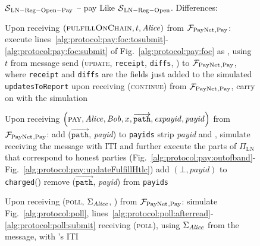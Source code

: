 \begin{figure}[!htbp]
  \begin{simulatorbox}{$\mathcal{S}{}_{\mathrm{LN - Reg - Open - Pay}}$ -- pay}
    Like $\mathcal{S}{}_{\mathrm{LN - Reg - Open}}$. Differences:
    \begin{algorithmic}[1]
      \State Upon receiving $\left(\textsc{fulfillOnChain}, t, \mathit{Alice}\right)$
      from $\mathcal{F}_{\mathrm{PayNet}}{}_{\mathrm{, Pay}}$:
      \label{alg:sim:pay:foc:top}
      \Indent
        \State execute
        lines~\ref{alg:protocol:pay:foc:tosubmit}-\ref{alg:protocol:pay:foc:submit}
        of Fig.~\ref{alg:protocol:pay:foc} as \alice{}, using $t$ from message
        \label{alg:sim:pay:foc:run}
          \State send (\textsc{update}, \texttt{receipt}, \texttt{diffs},
          \alice) to $\mathcal{F}_{\mathrm{PayNet}}{}_{\mathrm{, Pay}}$, where \texttt{receipt} and
          \texttt{diffs} are the fields just added to the simulated
          \texttt{updatesToReport}
          \label{alg:sim:foc:report}
          \State upon receiving (\textsc{continue}) from $\mathcal{F}_{\mathrm{PayNet}}{}_{\mathrm{,
          Pay}}$, carry on with the simulation
        \EndIf
      \EndIndent
      \Statex

      \State Upon receiving $\left(\textsc{pay}, \mathit{Alice}, \mathit{Bob}, x,
      \overrightarrow{\mathtt{path}}, \mathit{expayid}, \mathit{payid}\right)$
      from $\mathcal{F}_{\mathrm{PayNet}}{}_{\mathrm{, Pay}}$:
      \Indent
        \State add ($\overrightarrow{\mathtt{path}}$, \textit{payid}) to
        \texttt{payids}
        \State strip \textit{payid} and \alice, simulate receiving the message
        with \alice{} ITI and further execute the parts of $\Pi_{\mathrm{LN}}$
        that correspond to honest parties
        (Fig.~\ref{alg:protocol:pay:outofband}-
        Fig.~\ref{alg:protocol:pay:updateFulfillHtlc})
        \label{alg:sim:pay:simulate}
         
          \State add $\left(\bot, \mathit{payid}\right)$ to
          \texttt{charged}(\alice)
          \State remove ($\overrightarrow{\mathtt{path}}$, \textit{payid}) from
          \texttt{payids}
        \EndIf
      \EndIndent
      \Statex

      \State Upon receiving (\textsc{poll}, $\Sigma_{\mathit{Alice}}$, \alice) from
      $\mathcal{F}_{\mathrm{PayNet}}{}_{\mathrm{, Pay}}$:
      \Indent
        \State simulate Fig.~\ref{alg:protocol:poll},
        lines~\ref{alg:protocol:poll:afterread}-\ref{alg:protocol:poll:submit}
        receiving (\textsc{poll}), using $\Sigma_{\mathit{Alice}}$ from the message,
        with \alice's ITI
        \label{alg:sim:poll:run}
      \EndIndent
    \end{algorithmic}
  \end{simulatorbox}
  \caption{}
  \label{alg:sim:pay}
\end{figure}

